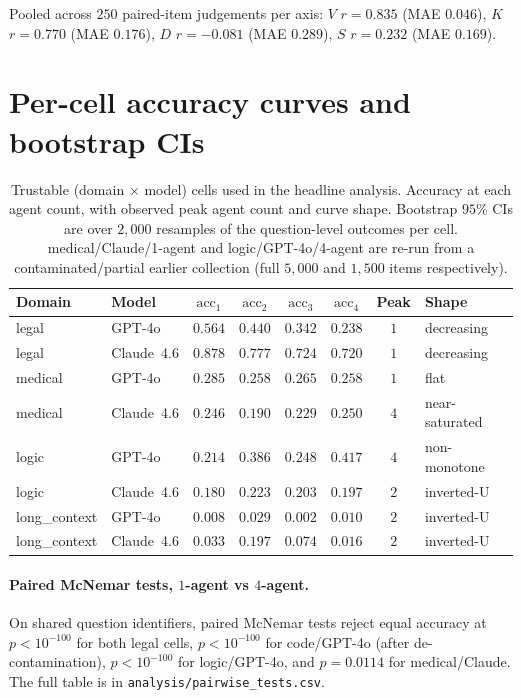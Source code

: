 \documentclass{article}
\begin{document}
Pooled across $250$ paired-item judgements per axis: $V$ $r=0.835$ (MAE $0.046$), $K$ $r=0.770$ (MAE $0.176$), $D$ $r=-0.081$ (MAE $0.289$), $S$ $r=0.232$ (MAE $0.169$).


\section{Per-cell accuracy curves and bootstrap CIs}
\label{app:per-cell}

\begin{table}[h]
\centering
\caption{Trustable (domain $\times$ model) cells used in the headline analysis. Accuracy at each agent count, with observed peak agent count and curve shape. Bootstrap $95\%$ CIs are over $2{,}000$ resamples of the question-level outcomes per cell. medical/Claude/1-agent and logic/GPT-4o/4-agent are re-run from a contaminated/partial earlier collection (full $5{,}000$ and $1{,}500$ items respectively).}
\label{tab:trustable}
\setlength{\tabcolsep}{6pt}
\begin{tabular}{l@{\hskip 8pt}l c c c c c l}
\toprule
\textbf{Domain} & \textbf{Model} & $\mathrm{acc}_{1}$ & $\mathrm{acc}_{2}$ & $\mathrm{acc}_{3}$ & $\mathrm{acc}_{4}$ & \textbf{Peak} & \textbf{Shape} \\
\midrule
legal         & GPT-4o      & $0.564$ & $0.440$ & $0.342$ & $0.238$ & $1$ & decreasing \\
legal         & Claude~4.6  & $0.878$ & $0.777$ & $0.724$ & $0.720$ & $1$ & decreasing \\
medical       & GPT-4o      & $0.285$ & $0.258$ & $0.265$ & $0.258$ & $1$ & flat \\
medical       & Claude~4.6  & $0.246$ & $0.190$ & $0.229$ & $0.250$ & $4$ & near-saturated \\
logic         & GPT-4o      & $0.214$ & $0.386$ & $0.248$ & $0.417$ & $4$ & non-monotone \\
logic         & Claude~4.6  & $0.180$ & $0.223$ & $0.203$ & $0.197$ & $2$ & inverted-U \\
long\_context & GPT-4o      & $0.008$ & $0.029$ & $0.002$ & $0.010$ & $2$ & inverted-U \\
long\_context & Claude~4.6  & $0.033$ & $0.197$ & $0.074$ & $0.016$ & $2$ & inverted-U \\
\bottomrule
\end{tabular}
\end{table}

\paragraph{Paired McNemar tests, $1$-agent vs $4$-agent.} On shared question identifiers, paired McNemar tests reject equal accuracy at $p<10^{-100}$ for both legal cells, $p<10^{-100}$ for code/GPT-4o (after de-contamination), $p<10^{-100}$ for logic/GPT-4o, and $p=0.0114$ for medical/Claude. The full table is in \texttt{analysis/pairwise\_tests.csv}.
\end{document}
